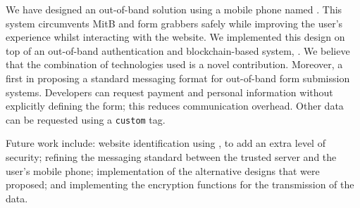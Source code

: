 We have designed an out-of-band solution using a mobile phone named \formless. This system circumvents MitB and form grabbers safely while improving the user's experience whilst interacting with the website. We implemented this design on top of an out-of-band authentication and blockchain-based system, \deeid. We believe that the combination of technologies used is a novel contribution. Moreover, a first in proposing a standard messaging format for out-of-band form submission systems. Developers can request payment and personal information without explicitly defining the form; this reduces communication overhead. Other data can be requested using a \texttt{custom} tag.

Future work include: website identification using \deeid, to add an extra level of security; refining the messaging standard between the trusted server and the user's mobile phone; implementation of the alternative designs that were proposed; and implementing the encryption functions for the transmission of the data.